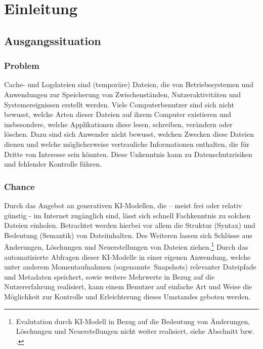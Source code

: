 \documentclass[a4paper,12pt]{report}
\begin{document}
    \chapter{Einleitung}


    \section{Ausgangssituation}

    \subsection{Problem}\label{subsec:problem}
    Cache- und Logdateien sind (temporäre) Dateien, die von Betriebssystemen und
    Anwendungen zur Speicherung von Zwischenständen, Nutzeraktivitäten und
    Systemereignissen erstellt werden.
    Viele Computerbenutzer sind sich nicht bewusst, welche Arten dieser Dateien auf ihrem
    Computer existieren und insbesondere, welche Applikationen diese lesen, schreiben,
    verändern oder löschen.
    Dazu sind sich Anwender nicht bewusst, welchen Zwecken
    diese Dateien dienen und welche möglicherweise vertrauliche Informationen enthalten,
    die für Dritte von Interesse sein könnten.
    Diese Unkenntnis kann zu Datenschutzrisiken
    und fehlender Kontrolle führen.

    \subsection{Chance}\label{subsec:chance}
    Durch das Angebot an generativen KI-Modellen, die – meist frei oder relativ günstig - im
    Internet zugänglich sind, lässt sich schnell Fachkenntnis zu solchen Dateien einholen.
    Betrachtet werden hierbei vor allem die Struktur (Syntax) und Bedeutung (Semantik) von Dateiinhalten.
    Des Weiteren lassen sich Schlüsse aus Änderungen, Löschungen und Neuerstellungen von Dateien ziehen.\footnote{Evalutation durch KI-Modell in Bezug auf die Bedeutung von Änderungen, Löschungen und Neuerstellungen nicht weiter realisiert, siehe Abschnitt  bzw. .}
    Durch das automatisierte Abfragen dieser KI-Modelle in einer eigenen Anwendung,
    welche unter anderem Momentaufnahmen (sogenannte\ Snapshots) relevanter Dateipfade und Metadaten speichert,
    sowie weitere Mehrwerte in Bezug auf die Nutzererfahrung realisiert, kann einem
    Benutzer auf einfache Art und Weise die Möglichkeit zur Kontrolle und Erleichterung dieses Umstandes
    geboten werden.
\end{document}
